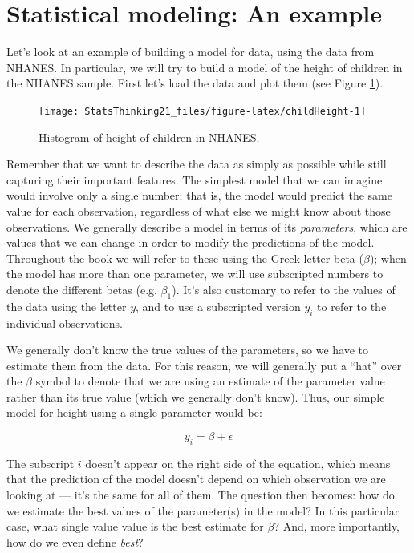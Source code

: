 \documentclass[12pt,]{book}
\theoremstyle{definition}
\theoremstyle{definition}
\theoremstyle{definition}
\theoremstyle{remark}
\begin{document}
\hypertarget{statistical-modeling-an-example}{%
\section{Statistical modeling: An example}\label{statistical-modeling-an-example}}

Let's look at an example of building a model for data, using the data from NHANES. In particular, we will try to build a model of the height of children in the NHANES sample. First let's load the data and plot them (see Figure \ref{fig:childHeight}).

\begin{figure}
\texttt{[image: StatsThinking21\_files/figure-latex/childHeight-1]} \caption{Histogram of height of children in NHANES.}\label{fig:childHeight}
\end{figure}

Remember that we want to describe the data as simply as possible while still capturing their important features. The simplest model that we can imagine would involve only a single number; that is, the model would predict the same value for each observation, regardless of what else we might know about those observations. We generally describe a model in terms of its \emph{parameters}, which are values that we can change in order to modify the predictions of the model. Throughout the book we will refer to these using the Greek letter beta (\(\beta\)); when the model has more than one parameter, we will use subscripted numbers to denote the different betas (e.g. \(\beta_1\)). It's also customary to refer to the values of the data using the letter \(y\), and to use a subscripted version \(y_i\) to refer to the individual observations.

We generally don't know the true values of the parameters, so we have to estimate them from the data. For this reason, we will generally put a ``hat'' over the \(\beta\) symbol to denote that we are using an estimate of the parameter value rather than its true value (which we generally don't know). Thus, our simple model for height using a single parameter would be:

\[
y_i = \beta + \epsilon
\]

The subscript \(i\) doesn't appear on the right side of the equation, which means that the prediction of the model doesn't depend on which observation we are looking at --- it's the same for all of them. The question then becomes: how do we estimate the best values of the parameter(s) in the model? In this particular case, what single value value is the best estimate for \(\beta\)? And, more importantly, how do we even define \emph{best}?
\end{document}
